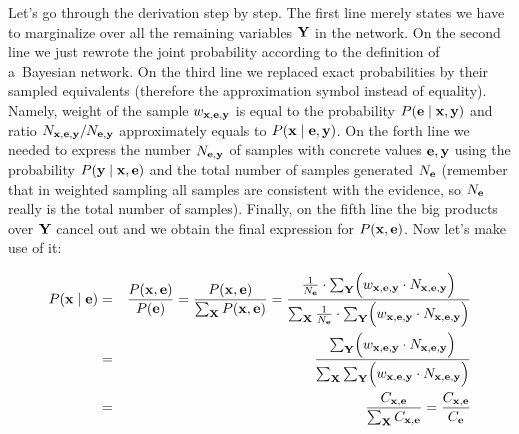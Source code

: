 \documentclass[english,cover]{fitthesis} %
\newcommand{\vars}[1]{{\bold{#1}}}         %
\begin{document}
Let's go through the derivation step by step. The first line merely states we have to marginalize over all the remaining variables $\vars{Y}$ in the network.
On the second line we just rewrote the joint probability according to the definition of a~Bayesian network.
On the third line we replaced exact probabilities by their sampled equivalents (therefore the approximation symbol instead of equality). Namely, weight of the sample $w_{\vars{x},\vars{e},\vars{y}}$ is equal to the probability $P(\vars{e} \mid \vars{x},\vars{y})$ and ratio $N_{\vars{x},\vars{e},\vars{y}} / N_{\vars{e},\vars{y}}$ approximately equals to $P(\vars{x} \mid \vars{e},\vars{y})$.
On the forth line we needed to express the number $N_{\vars{e},\vars{y}}$ of samples with concrete values $\vars{e},\vars{y}$ using the probability $P(\vars{y} \mid \vars{x},\vars{e})$ and the total number of samples generated $N_\vars{e}$ (remember that in weighted sampling all samples are consistent with the evidence, so $N_\vars{e}$ really is the total number of samples).
Finally, on the fifth line the big products over $\vars{Y}$ cancel out and we obtain the final expression for $P(\vars{x},\vars{e})$.
Now let's make use of it:

\begin{eqnarray*}
    P(\vars{x} \mid \vars{e})
    & = &
      \frac
        {P(\vars{x},\vars{e})}
        {P(\vars{e})} = \frac{P(\vars{x},\vars{e})}{\sum_\vars{X} P(\vars{x},\vars{e})}
    = \frac
        {\frac{1}{N_\vars{e}} \cdot \sum_\vars{Y} \Bigl( w_{\vars{x},\vars{e},\vars{y}} \cdot N_{\vars{x},\vars{e},\vars{y}}\Bigr)}
        {\sum_\vars{X} \frac{1}{N_\vars{e}} \cdot \sum_\vars{Y} \Bigl( w_{\vars{x},\vars{e},\vars{y}} \cdot N_{\vars{x},\vars{e},\vars{y}}\Bigr)} \\
    & = &
      \frac
        {\sum_\vars{Y} \Bigl( w_{\vars{x},\vars{e},\vars{y}} \cdot N_{\vars{x},\vars{e},\vars{y}}\Bigr)}
        {\sum_\vars{X} \sum_\vars{Y} \Bigl( w_{\vars{x},\vars{e},\vars{y}} \cdot N_{\vars{x},\vars{e},\vars{y}}\Bigr)} \\
    & = & \frac{C_{\vars{x},\vars{e}}}{\sum_\vars{X} C_{\vars{x},\vars{e}}}
      = \frac{C_{\vars{x},\vars{e}}}{C_{\vars{e}}}
\end{eqnarray*}
\end{document}

